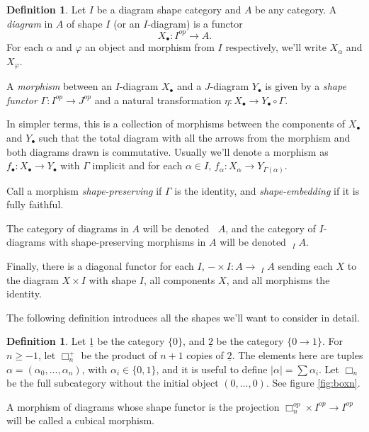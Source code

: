 \documentclass[proquest]{uwthesis}[2014/11/13]
\theoremstyle{definition}
\newtheorem{definition}[theorem]{Definition}
\DeclareMathOperator{\Diag}{\underline{Diag}}
\newcommand{\tu}{\underline{2}}
\begin{document}
\begin{definition}
	\label{def:diagram}
	Let $I$ be a diagram shape category and $A$ be any category.
	A \textit{diagram} in $A$ of shape $I$ (or an $I$-diagram) is a functor
	\[
		X_\bullet : I^{op} \rightarrow A.
	\]
	For each $\alpha$ and $\varphi$ an object and morphism from $I$ respectively, we'll write $X_\alpha$ and $X_\varphi$.
	
	A \textit{morphism} between an $I$-diagram $X_\bullet$ and a $J$-diagram $Y_\bullet$ is given by a \textit{shape functor} $\Gamma : I^{op} \rightarrow J^{op}$ and a natural transformation $\eta : X_\bullet \rightarrow Y_\bullet \circ \Gamma$.
	
	In simpler terms, this is a collection of morphisms between the components of $X_\bullet$ and $Y_\bullet$ such that the total diagram with all the arrows from the morphism and both diagrams drawn is commutative.
	Usually we'll denote a morphism as $f_\bullet : X_\bullet \rightarrow Y_\bullet$ with $\Gamma$ implicit and for each $\alpha \in I$, $f_\alpha : X_\alpha \rightarrow Y_{\Gamma(\alpha)}$.
	
	Call a morphism \textit{shape-preserving} if $\Gamma$ is the identity, and \textit{shape-embedding} if it is fully faithful.
	
	The category of diagrams in $A$ will be denoted $\Diag A$, and the category of $I$-diagrams with shape-preserving morphisms in $A$ will be denoted $\Diag_I A$.
	
	Finally, there is a diagonal functor for each $I$, $-\times I : A \rightarrow \Diag_I A$ sending each $X$ to the diagram $X \times I$ with shape $I$, all components $X$, and all morphisms the identity.
\end{definition}

The following definition introduces all the shapes we'll want to consider in detail.

\begin{definition}
	\label{def:cubicalcategories}
	Let $\underline{1}$ be the category $\{0\}$, and $\tu$ be the category $\{0 \rightarrow 1\}$.
	For $n \geq -1$, let $\Box_n^+$ be the product of $n+1$ copies of $\tu$.
	The elements here are tuples $\alpha = (\alpha_0, \dots, \alpha_n)$, with $\alpha_i \in \{0, 1\}$, and it is useful to define $|\alpha| = \sum \alpha_i$.
	Let $\Box_n$ be the full subcategory without the initial object $(0, \dots, 0)$.
	See figure \ref{fig:boxn}.
	
	A morphism of diagrams whose shape functor is the projection $\Box_n^{op} \times I^{op} \rightarrow I^{op}$ will be called a cubical morphism.
\end{definition}
\end{document}
